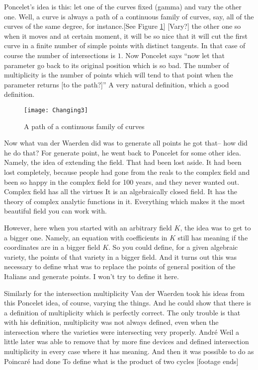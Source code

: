 \documentclass{article}
\begin{document}
Poncelet's idea is this:
let one of the curves fixed (gamma)
and vary the other one.
Well, a curve is always a path of a continuous family of curves,
say, all of the curves of the same degree, for instance.[See Figure \ref{fig:curvefamily}]
[Vary?] the other one
so when it moves
and at certain moment, it will be so nice 
that it will cut the first curve 
in a finite number of simple points with distinct tangents.
In that case of course the number of intersections is $1$.
Now Poncelet says ``now let that parameter go back to its original position
which is so bad.
The number of multiplicity is the number of points which will tend to that point
when the parameter returns [to the path?]''
A very natural definition,
which a good definition.

\begin{figure}[ht]
\caption{A path of a continuous family of curves}
\label{fig:curvefamily}
\centering
\texttt{[image: Changing3]}
\end{figure}

Now what van der Waerden did
was to generate all points 
he got that-- how did he do that?
For generate point, he went back to Poncelet for some other idea.
Namely, the idea of extending the field.
That had been lost aside.
It had been lost completely,
because people had gone from the reals to the complex field
and been so happy in the complex field for 100 years,
and they never wanted out.
Complex field has all the virtues
It is an algebraically closed field.
It has the theory of complex analytic functions in it.
Everything which makes it the most beautiful field you can work with.

However, here when you started with an arbitrary field $K$,
the idea was to get to a bigger one.
Namely, an equation with coefficients in $K$
still has meaning if the coordinates are in a bigger field $K$.
So you could define,
for a given algebraic variety,
the points of that variety in a bigger field.
And it turns out this was necessary to define what was
to replace the points of general position of the Italians
and generate points.
I won't try to define it here.

Similarly for the intersection multiplicity
Van der Waerden took his ideas from this Poncelet idea, of course,
varying the things.
And he could show that there is a definition of multiplicity
which is perfectly correct.
The only trouble is that with his definition,
multiplicity was not always defined,
even when the intersection where the varieties were intersecting very properly.
Andr\'e Weil a little later was able to remove that
by more fine devices and defined intersection multiplicity 
in every case where it has meaning.
And then it was possible to do as Poincar\'e had done
To define what is the product of two cycles [footage ends]
\end{document}
